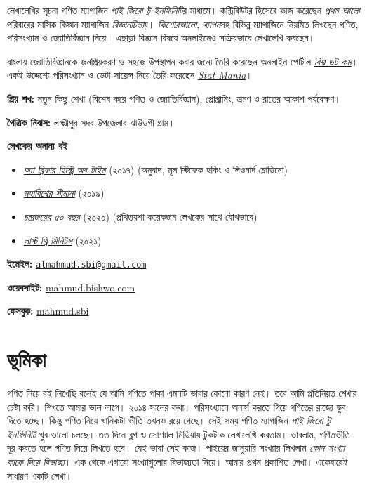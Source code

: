 \documentclass[
]{book}
\providecommand{\tightlist}{%
  \setlength{\itemsep}{0pt}\setlength{\parskip}{0pt}}
\begin{document}
লেখালেখির সূচনা গণিত ম্যাগাজিন \emph{পাই জিরো টু ইনফিনিটি}র মাধ্যমে। কন্ট্রিবিউটর হিসেবে কাজ করেছেন \emph{প্রথম আলো} পরিবারের মাসিক বিজ্ঞান ম্যাগাজিন \emph{বিজ্ঞানচিন্তা}য়। \emph{কিশোরআলো}, \emph{ব্যাপন}সহ বিভিন্ন ম্যাগাজিনে নিয়মিত লিখছেন গণিত, পরিসংখ্যান ও জ্যোতির্বিজ্ঞান নিয়ে। এছাড়া বিজ্ঞান বিষয়ে অনলাইনেও সক্রিয়ভাবে লেখালেখি করছেন।

বাংলায় জ্যোতির্বিজ্ঞানকে জনপ্রিয়করণ ও সহজে উপস্থাপন করার জন্যে তৈরি করেছেন অনলাইন পোর্টাল \href{https://sky.bishwo.com}{\emph{বিশ্ব ডট কম}}। একই উদ্দেশ্যে পরিসংখ্যান ও ডেটা সায়েন্স নিয়ে তৈরি করেছেন \href{https://www.statmania.info}{\emph{Stat Mania}}।

\textbf{প্রিয় শখ:} নতুন কিছু শেখা (বিশেষ করে গণিত ও জ্যোতির্বিজ্ঞান), প্রোগ্রামিং, ভ্রমণ ও রাতের আকাশ পর্যবেক্ষণ।

\textbf{পৈত্রিক নিবাস:} লক্ষ্মীপুর সদর উপজেলার ঝাউডগী গ্রাম।

\textbf{লেখকের অনান্য বই}

\begin{itemize}
\tightlist
\item
  \emph{\href{https://www.rokomari.com/book/author/47631}{অ্যা ব্রিফার হিস্ট্রি অব টাইম}} (২০১৭) (অনুবাদ, মূল স্টিফেক হকিং ও লিওনার্দ ম্লোডিনো)
\item
  \emph{\href{https://www.rokomari.com/book/author/47631}{মহাবিশ্বের সীমানা}} (২০১৯)
\item
  \emph{চন্দ্রজয়ের ৫০ বছর} (২০২০) (প্রথিতযশা কয়েকজন লেখকের সাথে যৌথভাবে)
\item
  \emph{\href{https://www.rokomari.com/book/author/47631}{লাস্ট থ্রি মিনিটস}} (২০২১)
\end{itemize}

\textbf{ইমেইল:} \href{mailto:almahmud.sbi@gmail.com}{\nolinkurl{almahmud.sbi@gmail.com}}

\textbf{ওয়েবসাইট:} \href{https://mahmud.bishwo.com}{mahmud.bishwo.com}

\textbf{ফেসবুক:} \href{https://fb.com/mahmud.sbi}{mahmud.sbi}

\hypertarget{ux9adux9c2ux9aeux9bfux995ux9be}{%
\section{ভূমিকা}\label{ux9adux9c2ux9aeux9bfux995ux9be}}

গণিত নিয়ে বই লিখেছি বলেই যে আমি গণিতে পাকা এমনটি ভাবার কোনো কারণ নেই। তবে আমি প্রতিনিয়ত শেখার চেষ্টা করি। শিখতে আমার ভাল লাগে। ২০১৪ সালের কথা। পরিসংখ্যানে অনার্স করতে গিয়ে গণিতের রাজ্যে ডুব দিতে হচ্ছে। কিন্তু গণিত নিয়ে খানিকটা ভীতি তখনও রয়ে গেছে। সেই সময় গণিত ম্যাগাজিন \emph{পাই জিরো টু ইনফিনিটি} খুব ভালো চলছে। তত দিনে ব্লগ ও সোশ্যাল মিডিয়ায় টুকটাক লেখালেখি করতাম। ভাবলাম, গণিতভীতি দূর করতে হলে গণিত নিয়ে লিখতে হবে। যেই ভাবা সেই কাজ। পাইয়ের জানুয়ারি সংখ্যায় লিখলাম \emph{কোন সংখ্যা কাকে দিয়ে বিভাজ্য}। এক থেকে এগারো সংখ্যাগুলোর বিভাজ্যতা নিয়ে। আমার প্রথম প্রকাশিত লেখা। একেবারেই সাধারণ একটি লেখা।
\end{document}

